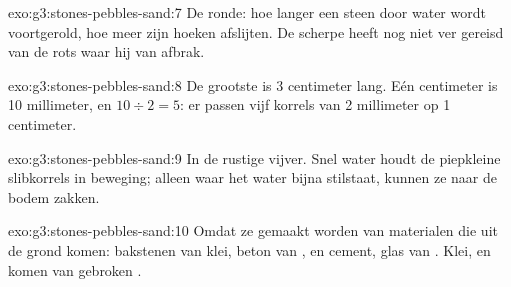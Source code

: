 \begin{solution}{exo:g3:stones-pebbles-sand:7}
De ronde: hoe langer een steen door water wordt voortgerold, hoe meer zijn
hoeken afslijten. De scherpe heeft nog niet ver gereisd van de rots waar
hij van afbrak.
\end{solution}

\begin{solution}{exo:g3:stones-pebbles-sand:8}
De grootste  is 3 centimeter lang. Eén centimeter is 10 millimeter,
en $10 \div 2 = 5$: er passen vijf korrels van 2 millimeter op
1 centimeter.
\end{solution}

\begin{solution}{exo:g3:stones-pebbles-sand:9}
In de rustige vijver. Snel water houdt de piepkleine slibkorrels in
beweging; alleen waar het water bijna stilstaat, kunnen ze naar de bodem
zakken.
\end{solution}

\begin{solution}{exo:g3:stones-pebbles-sand:10}
Omdat ze gemaakt worden van materialen die uit de grond komen: bakstenen
van klei, beton van ,  en cement, glas van . Klei,  en
 komen van gebroken .
\end{solution}
